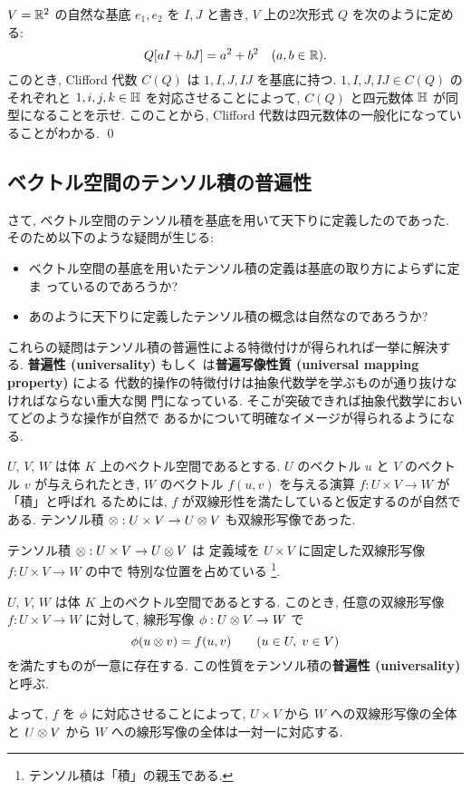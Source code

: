 \documentclass[12pt,twoside]{jarticle}
\begin{document}
\begin{question}
  $V={\mathbb R}^2$ の自然な基底 $e_1,e_2$ を $I,J$ と書き, 
  $V$ 上の2次形式 $Q$ を次のように定める:
  \begin{equation*}
    Q[aI+bJ] = a^2 + b^2  \quad (a,b\in{\mathbb R}).
  \end{equation*}
  このとき, Clifford 代数 $C(Q)$ は $1, I, J, IJ$ を基底に持つ.
  $1,I,J,IJ\in C(Q)$ のそれぞれと $1,i,j,k\in{\mathbb H}$ を対応させることによって,
  $C(Q)$ と四元数体 ${\mathbb H}$ が同型になることを示せ. 
  このことから, Clifford 代数は四元数体の一般化になっていることがわかる.
  \qed
\end{question}


\subsection{ベクトル空間のテンソル積の普遍性}

さて, ベクトル空間のテンソル積を基底を用いて天下りに定義したのであった.
そのため以下のような疑問が生じる:
\begin{itemize}
\item ベクトル空間の基底を用いたテンソル積の定義は基底の取り方によらずに定ま
  っているのであろうか?
\item あのように天下りに定義したテンソル積の概念は自然なのであろうか?
\end{itemize}
これらの疑問はテンソル積の普遍性による特徴付けが得られれば一挙に解決する.
{\bf 普遍性 (universality)} もしく
は{\bf 普遍写像性質 (universal mapping property)} による
代数的操作の特徴付けは抽象代数学を学ぶものが通り抜けなければならない重大な関
門になっている.  そこが突破できれば抽象代数学においてどのような操作が自然で
あるかについて明確なイメージが得られるようになる.

$U$, $V$, $W$ は体 $K$ 上のベクトル空間であるとする. 
$U$ のベクトル $u$ と $V$ のベクトル $v$ が与えられたとき, 
$W$ のベクトル $f(u,v)$ を与える演算 $f : U\times V \to W$ が「積」と呼ばれ
るためには, $f$ が双線形性を満たしていると仮定するのが自然である.
テンソル積 $\otimes : U\times V \to U\otimes V$ も双線形写像であった.

テンソル積 $\otimes : U\times V \to U\otimes V$ は
定義域を $U\times V$ に固定した双線形写像 $f : U\times V \to W$ の中で
特別な位置を占めている%
\footnote{テンソル積は「積」の親玉である.}.

\begin{theorem}[テンソル積の普遍性]
  $U$, $V$, $W$ は体 $K$ 上のベクトル空間であるとする.
  このとき, 任意の双線形写像 $f: U\times V\to W$ に対して,
  線形写像 $\phi: U\otimes V \to W$ で 
  \begin{equation}
    \label{eq:v-t-u}
    \phi(u\otimes v) = f(u,v) \qquad (u\in U,\; v\in V) 
  \end{equation}
  を満たすものが一意に存在する. 
  この性質をテンソル積の{\bf 普遍性 (universality)} と呼ぶ.

  よって, $f$ を $\phi$ に対応させることによって,
  $U\times V$ から $W$ への双線形写像の全体と
  $U\otimes V$ から $W$ への線形写像の全体は一対一に対応する.
\end{theorem}
\end{document}
